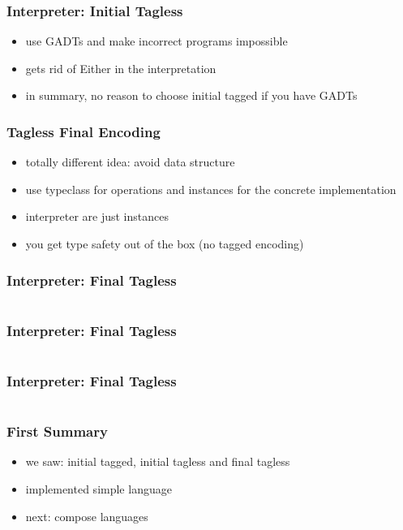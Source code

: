 \documentclass[aspectratio=169, hyperref={colorlinks, linkcolor=beamer@centricgreen}, urlcolor=links]{beamer}
\begin{document}
\begin{frame}
  \frametitle{Interpreter: Initial Tagless}
  \begin{itemize}
  \item use GADTs and make incorrect programs impossible
  \item gets rid of Either in the interpretation
  \item in summary, no reason to choose initial tagged if you have GADTs
  \end{itemize}
\end{frame}

\begin{frame}
  \frametitle{Tagless Final Encoding}
  \begin{itemize}
  \item totally different idea: avoid data structure
  \item use typeclass for operations and instances for the concrete implementation
  \item interpreter are just instances
  \item you get type safety out of the box (no tagged encoding)
  \end{itemize}
\end{frame}

\begin{frame}[fragile]
  \frametitle{Interpreter: Final Tagless}
  \inputminted[fontsize=\footnotesize]{scala}{snippets/final-tagless-expr.scala}
\end{frame}

\begin{frame}[fragile]
  \frametitle{Interpreter: Final Tagless}
  \inputminted[fontsize=\footnotesize]{scala}{snippets/final-tagless-sample.scala}
\end{frame}

\begin{frame}[fragile]
  \frametitle{Interpreter: Final Tagless}
  \inputminted[fontsize=\footnotesize]{scala}{snippets/final-tagless-interp.scala}
\end{frame}

\begin{frame}
  \frametitle{First Summary}
  \begin{itemize}
  \item we saw: initial tagged, initial tagless and final tagless
  \item implemented simple language
  \item next: compose languages
  \end{itemize}
\end{frame}
\end{document}
